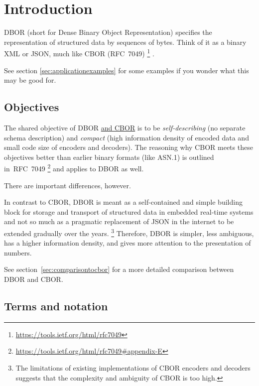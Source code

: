 
\section{Introduction}

DBOR (short for Dense Binary Object Representation) specifies the representation of structured data by
sequences of bytes. Think of it as a binary XML or JSON, much like CBOR (RFC~7049)%
\footnote{%
    \url{https://tools.ietf.org/html/rfc7049}
}%
.

\medskip
See section \ref{sec:applicationexamples} for some examples if you wonder what this may be good for.


\subsection{Objectives}

The shared objective of DBOR \href{https://tools.ietf.org/html/rfc7049\#section-1.1}{and CBOR} is to be
\emph{self-describing} (no separate schema description) and
\emph{compact} (high information density of encoded data and small code size of encoders and decoders).
The reasoning why CBOR meets these objectives better than earlier binary formats (like ASN.1) is outlined in~RFC~7049%
\footnote{%
    \url{https://tools.ietf.org/html/rfc7049\#appendix-E}
}
and applies to DBOR as well.

\medskip
There are important differences, however.

In contrast to CBOR, DBOR is meant as a self-contained and simple building block for storage and transport
of structured data in embedded real-time systems and not so much as a pragmatic replacement of JSON in the internet
to be extended gradually over the years.%
\footnote{%
    The limitations of existing implementations of CBOR encoders and decoders suggests
    that the complexity and ambiguity of CBOR is too high.
}
Therefore, DBOR is simpler, less ambiguous, has a higher information density, and gives more attention
to the presentation of numbers.

\medskip
See section~\ref{sec:comparisontocbor} for a more detailed comparison between DBOR and CBOR.


\subsection{Terms and notation}


